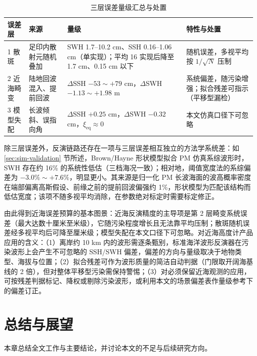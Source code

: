 \documentclass[a4paper]{article}
\newcommand{\song}{\CJKfamily{song}}
\newcommand{\wuhao}{\fontsize{10.5pt}{18pt}\selectfont}
\newcommand{\sectionbreak}{\clearpage} %
\begin{document}
\begin{table}[htpb]
	\centering
	\caption{三层误差量级汇总与处置}
	\label{tab:errorbudget}
	\song\wuhao
	\begin{tabular}{p{1.4cm}p{3.6cm}p{4.3cm}p{3.9cm}}
		\toprule
		误差层 & 来源 & 量级 & 特性与处置 \\
		\hline
		1 散斑 & 足印内散射元随机叠加 & SWH 1.7--10.2 cm、SSH 0.16--1.06 cm（单实现）；平均 16 实现后降至 1.7 cm、0.15 cm 以下 & 随机误差，多视平均按 $1/\sqrt{N}$ 压制 \\
		2 近海畸变 & 陆地回波混入、提前回波 & $\Delta$SSH $-53 \sim +79$ cm，$\Delta$SWH $-1.13 \sim +1.98$ m & 系统偏差，随污染增强；拟合残差可指示（平移型漏检） \\
		3 模型失配 & 长波倾斜、误指向角 & $\Delta$SSH $+0.25$ cm，$\Delta$SWH $-0.32$ cm，$\xi_{\mathrm{eq}} \approx 0$ & 本文仿真口径下可忽略 \\
		\bottomrule
	\end{tabular}
\end{table}

除三层误差外，反演链路还存在一项与三层误差相互独立的方法学系统差：如 \ref{sec:sim-validation} 节所述，Brown/Hayne 形状模型拟合 PM 仿真系综波形时，SWH 存在约 16\% 的系统性低估（三档海况一致）；相对地，阈值宽度法的系综偏差为 $-3.0\% \sim +7.6\%$，明显更小。其来源是归一化 PM 长波海面的波高概率密度在端部偏离高斯假设、前缘之前的提前回波偏强约 1\%，形状模型为匹配该结构而低估宽度；该项不随多视平均消除，在参数绝对标定时需要标定修正。

由此得到近海误差预算的基本图景：近海反演精度的主导项是第 2 层畸变系统误差（最大达数十厘米至米级），它随污染程度增长且无法靠平均压制；散斑随机误差经多视平均后可降至厘米级；模型失配在本文口径下可忽略。对近海高度计产品应用的含义：（1）离岸约 10 km 内的波形需逐条甄别，标准海洋波形反演器在污染波形上会产生不可忽略的 SSH/SWH 偏差，偏差的方向与量级取决于地物类型、海拔与位置；（2）拟合残差可作为波形质量的简洁自动判据（门限取开阔海基线的 2 倍），但对整体平移型污染需保持警惕；（3）对必须保留近海观测的应用，可按残差判据标记、降权或剔除污染波形，或利用本文的场景偏差表作量级参考下的偏差订正。

\sectionbreak

\section{总结与展望}
\label{chap:conclusion}

本章总结全文工作与主要结论，并讨论本文的不足与后续研究方向。
\end{document}
